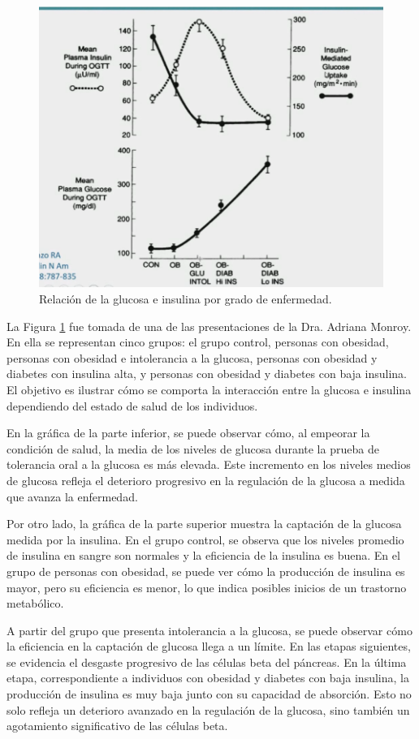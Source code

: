 \begin{figure}[H]
    \centering
    \includegraphics[width = 0.6 \textwidth]{Imagenes/InsulinaGlucosa.png}
    \caption{Relación de la glucosa e insulina por grado de enfermedad.}
    \label{fig:relGluIns}
\end{figure}

La Figura \ref{fig:relGluIns} fue tomada de una de las presentaciones de la Dra. Adriana Monroy. En ella se representan cinco grupos: el grupo control, personas con obesidad, personas con obesidad e intolerancia a la glucosa, personas con obesidad y diabetes con insulina alta, y personas con obesidad y diabetes con baja insulina. El objetivo es ilustrar cómo se comporta la interacción entre la glucosa e insulina dependiendo del estado de salud de los individuos.

En la gráfica de la parte inferior, se puede observar cómo, al empeorar la condición de salud, la media de los niveles de glucosa durante la prueba de tolerancia oral a la glucosa es más elevada. Este incremento en los niveles medios de glucosa refleja el deterioro progresivo en la regulación de la glucosa a medida que avanza la enfermedad.

Por otro lado, la gráfica de la parte superior muestra la captación de la glucosa medida por la insulina. En el grupo control, se observa que los niveles promedio de insulina en sangre son normales y la eficiencia de la insulina es buena. En el grupo de personas con obesidad, se puede ver cómo la producción de insulina es mayor, pero su eficiencia es menor, lo que indica posibles inicios de un trastorno metabólico.

A partir del grupo que presenta intolerancia a la glucosa, se puede observar cómo la eficiencia en la captación de glucosa llega a un límite. En las etapas siguientes, se evidencia el desgaste progresivo de las células beta del páncreas. En la última etapa, correspondiente a individuos con obesidad y diabetes con baja insulina, la producción de insulina es muy baja junto con su capacidad de absorción. Esto no solo refleja un deterioro avanzado en la regulación de la glucosa, sino también un agotamiento significativo de las células beta.

